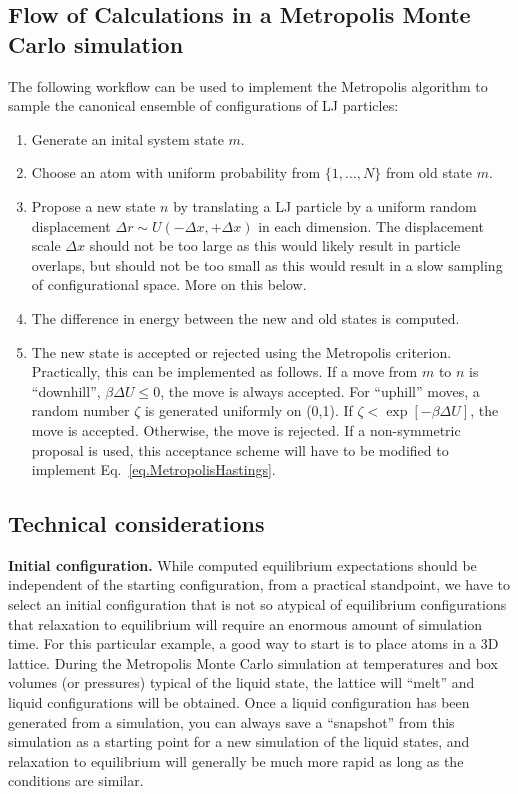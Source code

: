 \documentclass[aip,jcp,preprint,superscriptaddress,floatfix]{revtex4-1}
\begin{document}
\subsection{Flow of Calculations in a Metropolis Monte Carlo simulation}

The following workflow can be used to implement the Metropolis algorithm to sample the canonical ensemble of configurations of LJ particles:

\begin{enumerate}
\setlength{\itemsep}{0em} %
\item Generate an inital system state $m$.
\item Choose an atom with uniform probability from $\{1, \ldots, N\}$ from old state $m$.
\item Propose a new state $n$ by translating a LJ particle by a uniform random displacement $\Delta r \sim U(-\Delta x, +\Delta x)$ in each dimension.
	The displacement scale $\Delta x$ should not be too large as this would
	likely result in particle overlaps, but should not be too small
	as this would result in a slow sampling of configurational space.
	More on this below.
\item The difference in energy between the new and old states is computed.
\item The new state is accepted or rejected using the Metropolis criterion.
	Practically, this can be implemented as follows. 
	If a move from $m$ to $n$ is ``downhill'', $\beta \Delta U \leq 0$,
	the move is always accepted. For ``uphill'' moves, a random
	number $\zeta$ is generated uniformly on (0,1).  
	If $\zeta < \exp[-\beta {\Delta U}]$, the move is
	accepted.  Otherwise, the move is rejected. 
	If a non-symmetric proposal is used, this acceptance scheme will have to be modified to implement Eq.~\ref{eq.MetropolisHastings}.
\end{enumerate}

\subsection{Technical considerations}

\textbf{Initial configuration.} 
While computed equilibrium expectations should be independent of the starting configuration, from a practical standpoint, we have to select an initial configuration that is not so atypical of equilibrium configurations that relaxation to equilibrium will require an enormous amount of simulation time. 
For this particular example, a good way to start is to place atoms in a 3D lattice. 
During the Metropolis Monte Carlo simulation at temperatures and box volumes (or pressures) typical of the liquid state, the lattice will ``melt'' and liquid configurations will be obtained. 
Once a liquid configuration has been generated from a simulation, you can always save a ``snapshot'' from this simulation as a starting point for a new simulation of the liquid states, and relaxation to equilibrium will generally be much more rapid as long as the conditions are similar.
\end{document}
